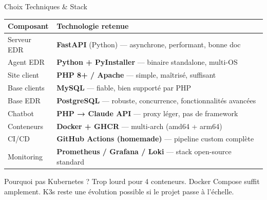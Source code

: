 \documentclass[xcolor=dvipsnames, aspectratio=169, 10pt]{beamer}
\begin{document}
\begin{frame}{Choix Techniques \& Stack}
  \centering
  \begin{tabularx}{\textwidth}{@{}l X@{}}
    \toprule
    \textbf{Composant} & \textbf{Technologie retenue} \\
    \midrule
    Serveur EDR & \textbf{FastAPI} (Python) — asynchrone, performant, bonne doc \\
    Agent EDR & \textbf{Python + PyInstaller} — binaire standalone, multi-OS \\
    Site client & \textbf{PHP 8+ / Apache} — simple, maîtrisé, suffisant \\
    Base clients & \textbf{MySQL} — fiable, bien supporté par PHP \\
    Base EDR & \textbf{PostgreSQL} — robuste, concurrence, fonctionnalités avancées \\
    Chatbot & \textbf{PHP → Claude API} — proxy léger, pas de framework \\
    Conteneurs & \textbf{Docker + GHCR} — multi-arch (amd64 + arm64) \\
    CI/CD & \textbf{GitHub Actions (homemade)} — pipeline custom complète \\
    Monitoring & \textbf{Prometheus / Grafana / Loki} — stack open-source standard \\
    \bottomrule
  \end{tabularx}

  \vspace{0.3cm}
  \begin{exampleblock}{Pourquoi pas Kubernetes ?}
    Trop lourd pour 4 conteneurs. Docker Compose suffit amplement.
    K3s reste une évolution possible si le projet passe à l'échelle.
  \end{exampleblock}
\end{frame}
\end{document}
